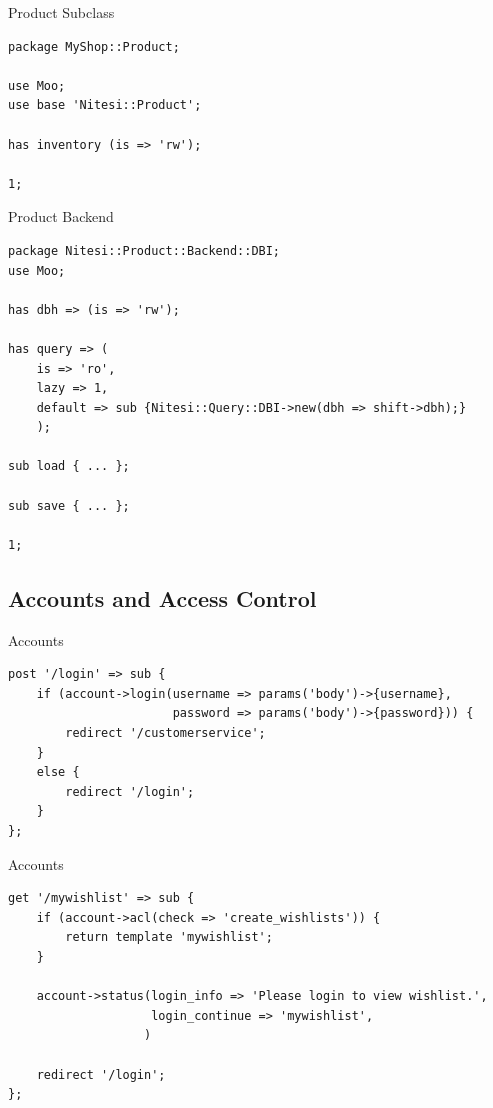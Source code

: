 \begin{frame}[fragile]{Product Subclass}
\begin{lstlisting}
package MyShop::Product;

use Moo;
use base 'Nitesi::Product';

has inventory (is => 'rw');

1;
\end{lstlisting}
\end{frame}

\begin{frame}[fragile]{Product Backend}
\begin{lstlisting}
package Nitesi::Product::Backend::DBI;
use Moo;

has dbh => (is => 'rw');

has query => (
    is => 'ro',
    lazy => 1,
    default => sub {Nitesi::Query::DBI->new(dbh => shift->dbh);}
    );

sub load { ... };

sub save { ... };

1;
\end{lstlisting}
\end{frame}

\subsection{Accounts and Access Control}

\begin{frame}[fragile]{Accounts}
\begin{lstlisting}
post '/login' => sub {
    if (account->login(username => params('body')->{username},
                       password => params('body')->{password})) {
        redirect '/customerservice';
    }
    else {
        redirect '/login';
    }
};
\end{lstlisting}
\end{frame}

\begin{frame}[fragile]{Accounts}
\begin{lstlisting}
get '/mywishlist' => sub {
    if (account->acl(check => 'create_wishlists')) {
        return template 'mywishlist';
    }

    account->status(login_info => 'Please login to view wishlist.',
                    login_continue => 'mywishlist',
                   )

    redirect '/login';
};
\end{lstlisting}
\end{frame}

